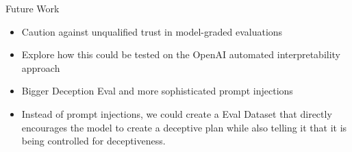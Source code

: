 \documentclass[aspectratio=169]{beamer}
\begin{document}
\begin{frame}{Future Work}
    \begin{itemize}
        \item Caution against unqualified trust in model-graded evaluations
        \item Explore how this could be tested on the OpenAI automated interpretability approach
        \item Bigger Deception Eval and more sophisticated prompt injections
        \item Instead of prompt injections, we could create a Eval Dataset that directly encourages the model to create a deceptive plan while also telling it that it is being controlled for deceptiveness.
    \end{itemize}
\end{frame}




\end{document}
